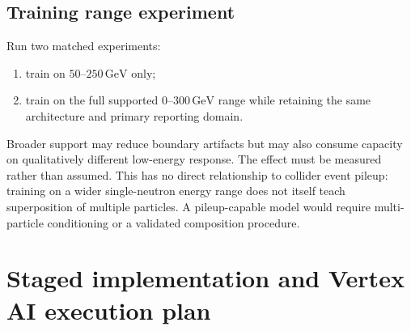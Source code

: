 \documentclass[11pt]{article}
\theoremstyle{definition}
\theoremstyle{remark}
\newcommand{\GeV}{\,\mathrm{GeV}}
\begin{document}
\subsection{Training range experiment}
Run two matched experiments:
\begin{enumerate}[label=\textbf{R\arabic*.},leftmargin=2em]
  \item train on $50$--$250\GeV$ only;
  \item train on the full supported $0$--$300\GeV$ range while retaining the same architecture and primary reporting domain.
\end{enumerate}
Broader support may reduce boundary artifacts but may also consume capacity on qualitatively different low-energy response. The effect must be measured rather than assumed. This has no direct relationship to collider event pileup: training on a wider single-neutron energy range does not itself teach superposition of multiple particles. A pileup-capable model would require multi-particle conditioning or a validated composition procedure.

\section{Staged implementation and Vertex AI execution plan}
\end{document}
